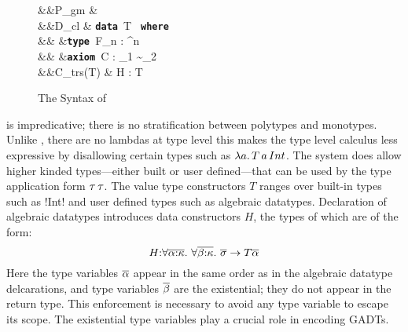 \documentclass[manuscript,screen,nonacm]{acmart}
\begin{document}
\begin{figure}[ht]
  \begin{syntax}
     &&P_{gm} \bnfeq&  \mathrel{;} \many{\Tm}\\
     &&D_{cl} \bnfeq& \textbf{\texttt{data }}\App T\co\many{\kappa} \to \star\App \textbf{\texttt{ where }}\App {} \\
                             &&       &\bnfor \textbf{\texttt{type }}\App F_n : \many\kappa^n \to \kappa\\
                             &&       &\bnfor  \textbf{\texttt{axiom }}\App C\App \many{\alpha\co\kappa} : \sigma_1 \sim \sigma_2\\
     &&C_{trs}(T) \bnfeq& H : \Forall {\many{\alpha\co\kappa}} { \many{(\tau \sim \tau)} \then \many\sigma \to T\many\alpha}\\
  \end{syntax}
  
  \caption{The Syntax of \SFC}
  \label{fig:system-fc-syntax}
\end{figure}

\SFC is impredicative; there is no stratification between polytypes and monotypes. Unlike \SFw, there are no lambdas at type level this makes the type level calculus less expressive by disallowing certain types such as $\lambda a.\, T\, a\, Int$. The system does allow higher kinded types---either built or user defined---that can be used by the type application form $\tau\,\tau$.  The value type constructors $T$ ranges over built-in types such as !Int! and user defined types such as algebraic datatypes. Declaration of algebraic datatypes introduces data constructors $H$, the types of which are of the form:
$$
H {:} \forall\overline{\alpha{:}\kappa}.~\forall\overline{\beta{:}\kappa}.~\overline{\sigma} \to T \overline{\alpha}
$$
Here the type variables $\overline{\alpha}$ appear in the same order as in the algebraic datatype delcarations,  and type variables $\overline{\beta}$ are the existential; they do not appear in the return type. This enforcement is necessary to avoid any type variable to escape its scope. The existential type variables play a crucial role in encoding GADTs. 
\end{document}
